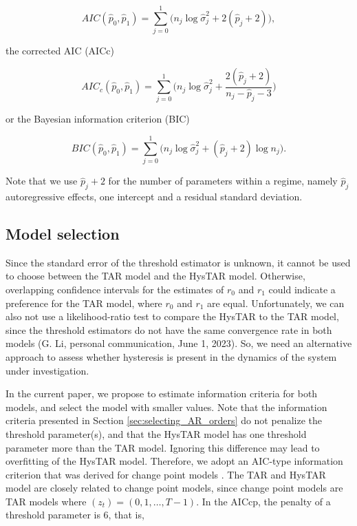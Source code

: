 \documentclass{article}
\begin{document}
\begin{equation}
AIC(\hat{p}_0, \hat{p}_1) = \sum_{j = 0}^{1} \Big(n_j \log \hat{\sigma}_{j}^2 + 2(\hat{p}_j + 2) \Big),
\end{equation}

the corrected AIC (AICc)

\begin{equation}
AIC_c(\hat{p}_0, \hat{p}_1) = \sum_{j = 0}^{1} \Bigg( n_j \log \hat{\sigma}_{j}^2 + 
\frac{2(\hat{p}_j + 2)}{n_j - \hat{p}_j - 3} \Bigg)
\end{equation}

or the Bayesian information criterion (BIC)

\begin{equation}
BIC(\hat{p}_0, \hat{p}_1) = \sum_{j = 0}^{1} \Big( n_j \log \hat{\sigma}_{j}^2 + (\hat{p}_j + 2)  \log n_j \Big).
\end{equation}

Note that we use $\hat{p}_j + 2$ for the number of parameters within a regime, namely $\hat{p}_j$ autoregressive effects, one intercept and a residual standard deviation.

\subsection{Model selection} \label{sec:model_selection}
Since the standard error of the threshold estimator is unknown, it cannot be used to choose between the TAR model and the HysTAR model.
Otherwise, overlapping confidence intervals for the estimates of $r_0$ and $r_1$ could indicate a preference for the TAR model, where $r_0$ and $r_1$ are equal.
Unfortunately, we can also not use a likelihood-ratio test to compare the HysTAR to the TAR model, since the threshold estimators do not have the same convergence rate in both models (G. Li, personal communication, June 1, 2023).
So, we need an alternative approach to assess whether hysteresis is present in the dynamics of the system under investigation.

In the current paper, we propose to estimate information criteria for both models, and select the model with smaller values.
Note that the information criteria presented in Section \ref{sec:selecting_AR_orders} do not penalize the threshold parameter(s), and that the HysTAR model has one threshold parameter more than the TAR model.
Ignoring this difference may lead to overfitting of the HysTAR model.
Therefore, we adopt an AIC-type information criterion that was derived for change point models \citep[AICcp,][]{aiccp}. The TAR and HysTAR model are closely related to change point models, since change point models are TAR models where $(z_t) = (0, 1, \dots, T-1)$. In the AICcp, the penalty of a threshold parameter is 6, that is,
\end{document}
